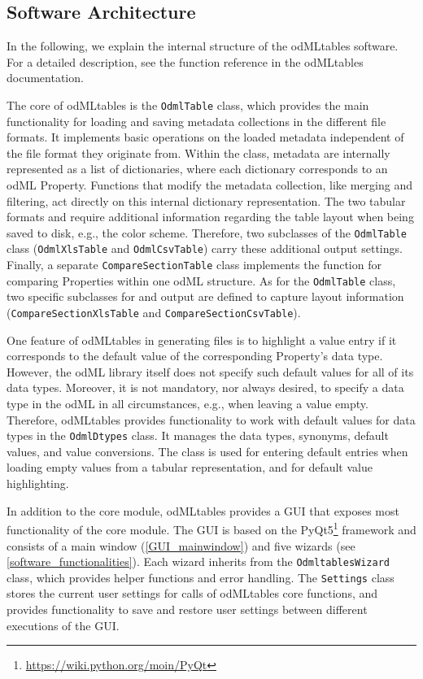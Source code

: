 \subsection{Software Architecture}
\label{sub:Software-Architecture}

In the following, we explain the internal structure of the odMLtables software. For a detailed description, see the function reference in the odMLtables documentation.

The core of odMLtables is the \texttt{OdmlTable} class, which provides the main functionality for loading and saving metadata collections in the different file formats. It implements basic operations on the loaded metadata independent of the file format they originate from. Within the class, metadata are internally represented as a list of dictionaries, where each dictionary corresponds to an odML Property. Functions that modify the metadata collection, like merging and filtering, act directly on this internal dictionary representation. The two tabular formats  and  require additional information regarding the table layout when being saved to disk, e.g., the color scheme. Therefore, two subclasses of the \texttt{OdmlTable} class (\texttt{OdmlXlsTable} and \texttt{OdmlCsvTable}) carry these additional output settings. Finally, a separate \texttt{CompareSectionTable} class implements the function for comparing Properties within one odML structure. As for the \texttt{OdmlTable} class, two specific subclasses for  and  output are defined to capture layout information (\texttt{CompareSectionXlsTable} and \texttt{CompareSectionCsvTable}).

One feature of odMLtables in generating  files is to highlight a value entry if it corresponds to the default value of the corresponding Property's data type. However, the odML library itself does not specify such default values for all of its data types. Moreover, it is not mandatory, nor always desired, to specify a data type in the odML in all circumstances, e.g., when leaving a value empty. Therefore, odMLtables provides functionality to work with default values for data types in the \texttt{OdmlDtypes} class. It manages the data types, synonyms, default values, and value conversions. The class is used for entering default entries when loading empty values from a tabular representation, and for default value highlighting.

In addition to the core module, odMLtables provides a GUI that exposes most functionality of the core module. The GUI is based on the PyQt5\footnote{\url{https://wiki.python.org/moin/PyQt}} framework and consists of a main window (\cref{GUI_mainwindow}) and five wizards (see \cref{software_functionalities}). Each wizard inherits from the \texttt{OdmltablesWizard} class, which provides helper functions and error handling. The \texttt{Settings} class stores the current user settings for calls of odMLtables core functions, and provides functionality to save and restore user settings between different executions of the GUI.


